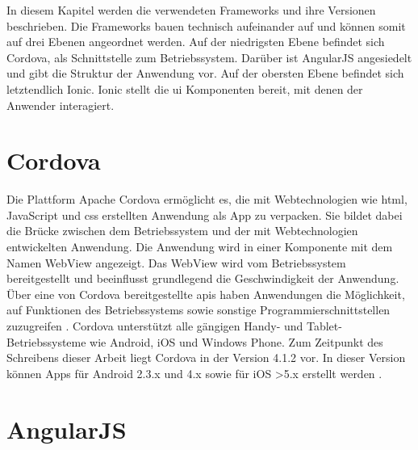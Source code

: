 \label{frameworks}

In diesem Kapitel werden die verwendeten Frameworks und ihre Versionen beschrieben. Die Frameworks bauen technisch aufeinander auf und können somit auf drei Ebenen angeordnet werden. Auf der niedrigsten Ebene befindet sich Cordova, als Schnittstelle zum Betriebssystem. Darüber ist AngularJS angesiedelt und gibt die Struktur der Anwendung vor. Auf der obersten Ebene befindet sich letztendlich Ionic. Ionic stellt die \gls{ui} Komponenten bereit, mit denen der Anwender interagiert. 

\section{Cordova}

Die Plattform Apache Cordova ermöglicht es, die mit Webtechnologien wie \gls{html}, JavaScript und \gls{css} erstellten Anwendung als App zu verpacken. Sie bildet dabei die Brücke zwischen dem Betriebssystem und der mit Webtechnologien entwickelten Anwendung. Die Anwendung wird in einer Komponente mit dem Namen \gls{WebView} angezeigt. Das \gls{WebView} wird vom Betriebssystem bereitgestellt und beeinflusst grundlegend die Geschwindigkeit der Anwendung. Über eine von Cordova bereitgestellte \glspl{api} haben Anwendungen die Möglichkeit, auf Funktionen des Betriebssystems sowie sonstige Programmierschnittstellen zuzugreifen \cite{cordova}.
Cordova unterstützt alle gängigen Handy- und Tablet-Betriebssysteme wie Android, iOS und Windows Phone. Zum Zeitpunkt des Schreibens dieser Arbeit liegt Cordova in der Version 4.1.2 vor. In dieser Version können Apps für Android 2.3.x und 4.x sowie für iOS >5.x erstellt werden \cite{cordova-android}\cite{cordova-ios}. 

\section{AngularJS}

